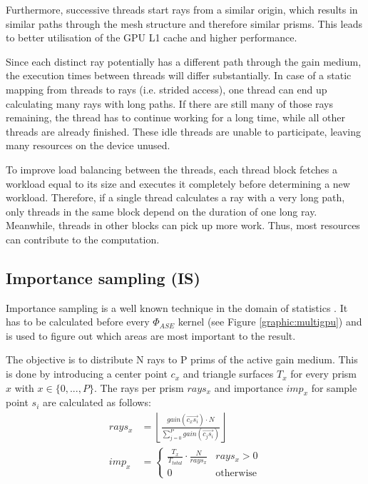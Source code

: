 Furthermore, successive threads start rays from a similar origin, which results
in similar paths through the mesh structure and therefore similar prisms. This
leads to better utilisation of the GPU L1 cache and higher performance.

Since each distinct ray potentially has a different path through the gain
medium, the execution times between threads will differ substantially. In case
of a static mapping from threads to rays (i.e. strided access), one thread can
end up calculating many rays with long paths. If there are still many of those
rays remaining, the thread has to continue working for a long time, while all
other threads are already finished. These idle threads are unable to
participate, leaving many resources on the device unused.

To improve load balancing between the threads, each thread block fetches a
workload equal to its size and executes it completely before determining a new
workload. Therefore, if a single thread calculates a ray with a very long path,
only threads in the same block depend on the duration of one long ray.
Meanwhile, threads in other blocks can pick up more work. Thus, most resources
can contribute to the computation.
    

\subsection{Importance sampling (IS)}
\label{subsec:importance_sampling}
Importance sampling is a well known technique in the domain
of statistics \cite{importanceSamplingSource}. It has to be calculated 
before every  $\Phi_{ASE}$ kernel (see Figure \ref{graphic:multigpu}) and is used 
to figure out which areas are most important to the result.

The objective is to distribute N rays to P prims of the active gain medium.
This is done by introducing a center point $c_x$ and triangle surfaces $T_x$ for every prism $x$ with $x \in \{0,...,P\}$.
The rays per prism $rays_x$ and importance $imp_x$ for sample point $s_i$ are calculated as follows:
\begin{align}
  rays_x       &= \left\lfloor\frac{gain(\overrightarrow{c_xs_i}) \cdot N}{\sum^{P}_{j=0} gain(\overrightarrow{c_js_i})}\right\rfloor\\
imp_x &= 
\begin{cases}
\frac{T_x}{T_{total}} \cdot \frac{N}{rays_x} &rays_x > 0\\
0 &\text{otherwise}
\end{cases}
\end{align}

